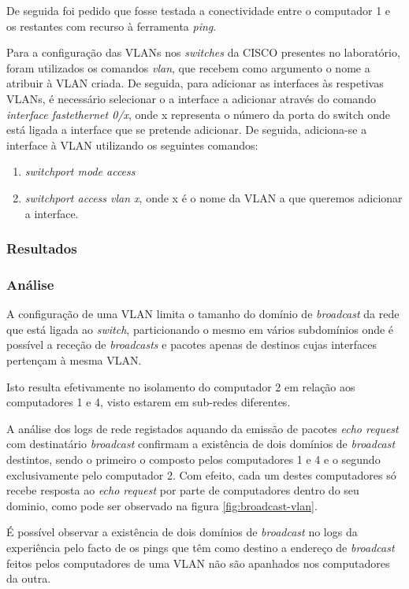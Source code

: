 \documentclass{article}
\begin{document}
De seguida foi pedido que fosse testada a conectividade entre o computador 1 e os restantes com recurso à ferramenta \textit{ping}.

Para a configuração das VLANs nos \textit{switches} da CISCO presentes no laboratório, foram utilizados os comandos \textit{vlan}, que recebem como argumento o nome a atribuir à VLAN criada. De seguida, para adicionar as interfaces às respetivas VLANs, é necessário selecionar o a interface a adicionar através do comando \textit{interface fastethernet 0/x}, onde x representa o número da porta do switch onde está ligada a interface que se pretende adicionar. De seguida, adiciona-se a interface à VLAN utilizando os seguintes comandos:
\begin{enumerate}
\item \textit{switchport mode access}
\item \textit{switchport access vlan x}, onde x é o nome da VLAN a que queremos adicionar a interface.
\end{enumerate}


\subsubsection{Resultados}

\subsubsection{Análise}
A configuração de uma VLAN limita o tamanho do domínio de \textit{broadcast} da rede que está ligada ao \textit{switch}, particionando o mesmo em vários subdomínios onde é possível a receção de \textit{broadcasts} e pacotes apenas de destinos cujas interfaces pertençam à mesma VLAN.

Isto resulta efetivamente no isolamento do computador 2 em relação aos computadores 1 e 4, visto estarem em sub-redes diferentes.

A análise dos logs de rede registados aquando da emissão de pacotes \textit{echo request} com destinatário \textit{broadcast} confirmam a existência de dois domínios de \textit{broadcast} destintos, sendo o primeiro o composto pelos computadores 1 e 4 e o segundo exclusivamente pelo computador 2. Com efeito, cada um destes computadores só recebe resposta ao \textit{echo request} por parte de computadores dentro do seu dominio, como pode ser observado na figura \ref{fig:broadcast-vlan}.




É possível observar a existência de dois domínios de \textit{broadcast} no logs da experiência pelo facto de os pings que têm como destino a endereço de \textit{broadcast} feitos pelos computadores de uma VLAN não são apanhados nos computadores da outra.
\end{document}
